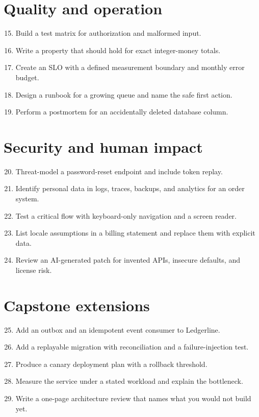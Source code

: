 \section{Quality and operation}
\begin{enumerate}
  \setcounter{enumi}{14}
  \item Build a test matrix for authorization and malformed input.
  \item Write a property that should hold for exact integer-money totals.
  \item Create an SLO with a defined measurement boundary and monthly error budget.
  \item Design a runbook for a growing queue and name the safe first action.
  \item Perform a postmortem for an accidentally deleted database column.
\end{enumerate}

\section{Security and human impact}
\begin{enumerate}
  \setcounter{enumi}{19}
  \item Threat-model a password-reset endpoint and include token replay.
  \item Identify personal data in logs, traces, backups, and analytics for an order system.
  \item Test a critical flow with keyboard-only navigation and a screen reader.
  \item List locale assumptions in a billing statement and replace them with explicit data.
  \item Review an AI-generated patch for invented APIs, insecure defaults, and license risk.
\end{enumerate}

\section{Capstone extensions}
\begin{enumerate}
  \setcounter{enumi}{24}
  \item Add an outbox and an idempotent event consumer to Ledgerline.
  \item Add a replayable migration with reconciliation and a failure-injection test.
  \item Produce a canary deployment plan with a rollback threshold.
  \item Measure the service under a stated workload and explain the bottleneck.
  \item Write a one-page architecture review that names what you would not build yet.
\end{enumerate}


